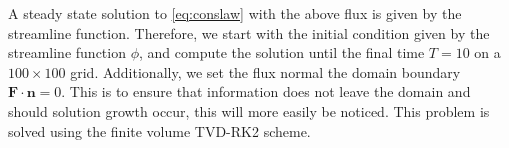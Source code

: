 A steady state solution to \eqref{eq:conslaw} with the above flux is given by the streamline function.  Therefore, we start with the initial condition given by the streamline function $\phi$, and compute the solution until the final time $T = 10$ on a $100 \times 100$ grid.  Additionally, we set the flux normal the domain boundary $\mathbf{F}\cdot \mathbf{n} = 0$.  This is to ensure that information does not leave the domain and should solution growth occur, this will more easily be noticed.
This problem is solved using the finite volume TVD-RK2 scheme. 


\begin{table}[h]
    \centering
    \quad
{}
    
\caption{Errors for overlapping neighborhoods study.} \label{tab:overlappingerrors}
\end{table}

